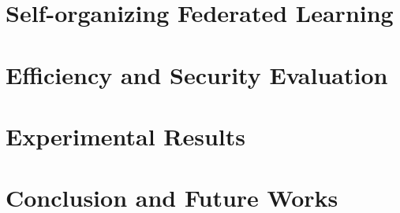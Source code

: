 \documentclass[journal]{IEEEtran}
\begin{document}
\section{Self-organizing Federated Learning}
\label{sec:sofl}


\section{Efficiency and Security Evaluation}
\label{sec:eval}


\section{Experimental Results}
\label{sec:exp}


\section{Conclusion and Future Works}
\label{sec:conc}





\end{document}
